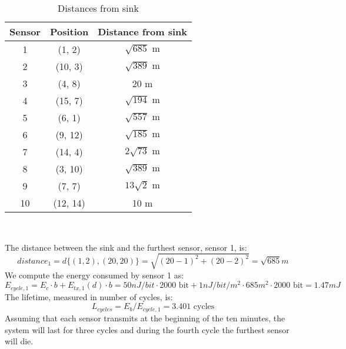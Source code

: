 \begin{table}[H]
\centering 
\begin{tabular}{| c | c | c |}
	\hline 
	\rowcolor{bluepoli!40}
	\textbf{Sensor} & \textbf{Position} & \textbf{Distance from sink}\T\B \\
	\hline 
	1 & (1, 2) & $\sqrt{685} \text{ m}$ \T\B\\
	2 &(10, 3) & $\sqrt{389} \text{ m}$ \T\B\\
	3 & (4, 8) & 20 m\T\B\\
	4 & (15, 7) & $\sqrt{194} \text{ m}$ \T\B\\
	5  & (6, 1) & $\sqrt{557} \text{ m}$ \T\B\\
	6  & (9, 12) & $\sqrt{185} \text{ m}$ \T\B\\
	7  & (14, 4) & $2\sqrt{73} \text{ m}$ \T\B\\
	8  & (3, 10) & $\sqrt{389} \text{ m}$ \T\B\\
	9  & (7, 7) & $13\sqrt{2} \text{ m}$ \T\B\\
	10  & (12, 14) & 10 m\T\B\\
	\hline
\end{tabular}
\\[10pt]
\caption{Distances from sink}
\end{table}

The distance between the sink and the furthest sensor, sensor 1, is: 
\[ 
distance_1 = d \{(1, 2) , (20, 20)\} = \sqrt{(20-1)^2 + (20-2)^2} = \sqrt{685} m 
\]
We compute the energy consumed by sensor 1 as:
\[
E_{cycle, 1} = E_c \cdot b + E_{tx, 1}(d) \cdot b = 50 nJ/bit \cdot 2000 \text{ bit} + 1 nJ/bit/m^2 \cdot 685 m^2 \cdot 2000 \text{ bit} = 1.47 mJ
\]
The lifetime, measured in number of cycles, is:
\[
L_{cycles} = E_b / E_{cycle, 1} = 3.401 \text{ cycles}
\]
Assuming that each sensor transmits at the beginning of the ten minutes, the system will last for three cycles and during the fourth cycle the furthest sensor will die.

